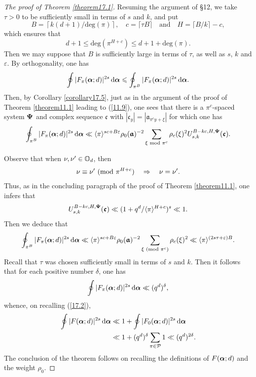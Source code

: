 \documentclass[12pt,reqno]{amsart}
\theoremstyle{definition}
\theoremstyle{remark}
\numberwithin{equation}{section}
\newcommand{\mmod}[1]{\,\,(\text{\rm mod}\,\,#1)}
\newcommand{\nmod}[1]{\,\,\text{\rm mod}\,\,#1}
\def\calP{{\mathcal P}}
\def\gra{{\mathfrak a}}\def\grA{{\mathfrak A}}\def\bfgra{{\boldsymbol \gra}}
\def\grc{{\mathfrak c}}\def\grC{{\mathfrak C}}\def\bfgrc{{\boldsymbol \grc}}
\def\del{{\delta}} \def\Del{{\Delta}} \def\Deltil{{\widetilde \Delta}}
\def\eps{\varepsilon}
\def\implies{\Rightarrow}
\def\le{\leqslant} \def\ge{\geqslant} \def\pleq{\preccurlyeq} \def\ple{\prec}
\def\d{{\,{\rm d}}}
\begin{document}
\begin{proof}[The proof of Theorem \ref{theorem17.1}]
\par Resuming the argument of \S12, we take $\tau>0$ to be sufficiently small in terms of 
$s$ and $k$, and put
$$B=\left\lceil k(d+1)/\text{deg}(\pi)\right\rceil ,\quad c=\lceil \tau B\rceil \quad 
\text{and}\quad H=\lceil B/k\rceil -c,$$
which ensures that
$$d+1\le \text{deg}\left( \pi^{H+c}\right) \le d+1+\text{deg}(\pi).$$
Then we may suppose that $B$ is sufficiently large in terms of $\tau$, as well as $s$, $k$ 
and $\eps$. By orthogonality, one has
$$\oint |F_\pi(\bfalp;d)|^{2s}\d\bfalp \le \oint_{\pi^B}|F_\pi(\bfalp;d)|^{2s}\d\bfalp .$$
Then, by Corollary \ref{corollary17.5}, just as in the argument of the proof of Theorem 
\ref{theorem11.1} leading to (\ref{11.9}), one sees that there is a $\pi^c$-spaced system 
${\boldsymbol \Psi}$ and complex sequence $\bfgrc$ with $|\grc_y|=|\gra_{\pi^cy+\xi}|$ for which one 
has
$$\oint_{\pi^B}|F_\pi(\bfalp;d)|^{2s}\d\bfalp \ll \langle \pi\rangle^{sc+B\eps}
\rho_0(\bfgra)^{-2}\sum_{\xi\nmod{\pi^c}}\rho_c(\xi)^2U_{s,k}^{B-kc,H,\bfPsi}(\bfgrc).
$$

\par Observe that when $\nu,\nu'\in {\mathbb O}_d$, then
$$\nu\equiv \nu'\mmod{\pi^{H+c}}\quad \implies \quad \nu=\nu'.$$
Thus, as in the concluding paragraph of the proof of Theorem \ref{theorem11.1}, one infers 
that
$$U_{s,k}^{B-kc,H,\bfPsi}(\bfgrc)\ll (1+q^d/\langle \pi\rangle^{H+c})^s\ll 1.$$
Then we deduce that
$$\oint_{\pi^B}|F_\pi(\bfalp;d)|^{2s}\d\bfalp \ll \langle \pi\rangle^{sc+B\eps}
\rho_0(\bfgra)^{-2}\sum_{\xi\mmod{\pi^c}}\rho_c(\xi)^2\ll \langle 
\pi\rangle^{(2s\tau+\eps)B}.$$
Recall that $\tau$ was chosen sufficiently small in terms of $s$ and $k$. Then it follows that 
for each positive number $\del$, one has
$$\oint |F_\pi(\bfalp;d)|^{2s}\d\bfalp \ll (q^d)^\del,$$
whence, on recalling (\ref{17.2}),
\begin{align*}
\oint |F(\bfalp;d)|^{2s}\d\bfalp &\ll 1+\oint |F_0(\bfalp;d)|^{2s}\d\bfalp \\
&\ll 1+(q^d)^\del\sum_{\pi \in \calP}1\ll (q^d)^{2\del}.
\end{align*}
The conclusion of the theorem follows on recalling the definitions of $F({\boldsymbol \alpha};d)$ and the 
weight $\rho_0$.
\end{proof}
\end{document}
